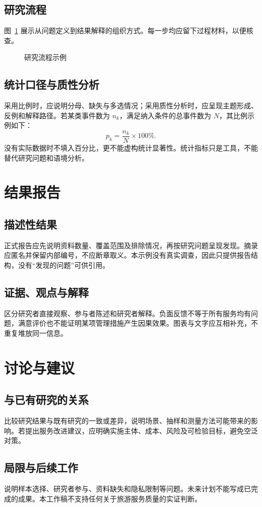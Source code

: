 \subsection{研究流程}
图~\ref{fig:tourism} 展示从问题定义到结果解释的组织方式。每一步均应留下过程材料，以便核查。
\begin{figure}[htbp]\centering
{}\caption{研究流程示例}\label{fig:tourism}
\end{figure}
\subsection{统计口径与质性分析}
采用比例时，应说明分母、缺失与多选情况；采用质性分析时，应呈现主题形成、反例和解释路径。若某类事件数为 $n_k$，满足纳入条件的总事件数为 $N$，其比例示例如下：
\begin{equation}p_k=\frac{n_k}{N}\times100\%.\end{equation}
没有实际数据时不填入百分比，更不能虚构统计显著性。统计指标只是工具，不能替代研究问题和语境分析。
\section{结果报告}
\subsection{描述性结果}
正式报告应先说明资料数量、覆盖范围及排除情况，再按研究问题呈现发现。摘录应匿名并保留内部编号，不应断章取义。本示例没有真实调查，因此只提供报告结构，没有“发现的问题”可供引用。
\subsection{证据、观点与解释}
区分研究者直接观察、参与者陈述和研究者解释。负面反馈不等于所有服务均有问题，满意评价也不能证明某项管理措施产生因果效果。图表与文字应互相补充，不重复堆放同一信息。
\section{讨论与建议}
\subsection{与已有研究的关系}
比较研究结果与既有研究的一致或差异，说明场景、抽样和测量方法可能带来的影响。若提出服务改进建议，应明确实施主体、成本、风险及可检验目标，避免空泛对策。
\subsection{局限与后续工作}
说明样本选择、研究者参与、资料缺失和隐私限制等问题。未来计划不能写成已完成的成果。本工作稿不支持任何关于旅游服务质量的实证判断。
